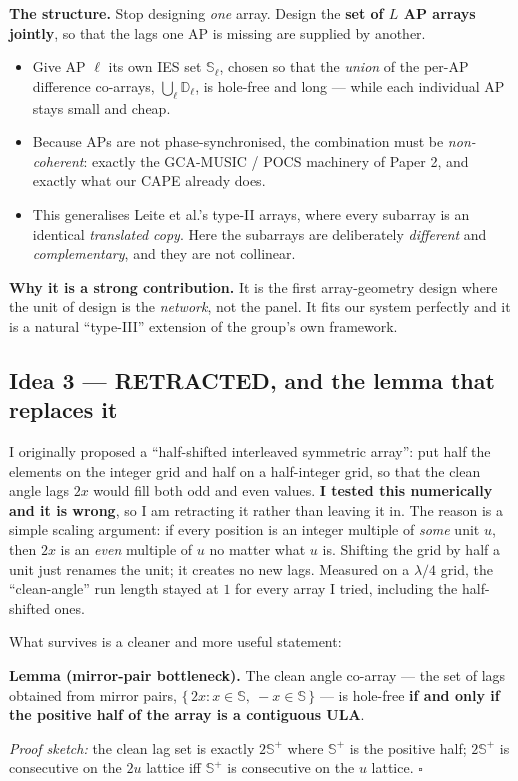 \documentclass[11pt]{article}
\begin{document}
\begin{ideabox}
\textbf{The structure.} Stop designing \emph{one} array. Design the \textbf{set of $L$ AP arrays
jointly}, so that the lags one AP is missing are supplied by another.
\begin{itemize}
\item Give AP $\ell$ its own IES set $\mathbb{S}_\ell$, chosen so that the \emph{union} of the
per-AP difference co-arrays, $\bigcup_\ell \mathbb{D}_\ell$, is hole-free and long --- while each
individual AP stays small and cheap.
\item Because APs are not phase-synchronised, the combination must be \emph{non-coherent}: exactly
the GCA-MUSIC / POCS machinery of Paper 2, and exactly what our CAPE already does.
\item This generalises Leite et al.'s type-II arrays, where every subarray is an identical
\emph{translated copy}. Here the subarrays are deliberately \emph{different} and
\emph{complementary}, and they are not collinear.
\end{itemize}
\textbf{Why it is a strong contribution.} It is the first array-geometry design where the unit of
design is the \emph{network}, not the panel. It fits our system perfectly and it is a natural
``type-III'' extension of the group's own framework.
\end{ideabox}

\subsection{Idea 3 --- RETRACTED, and the lemma that replaces it}

I originally proposed a ``half-shifted interleaved symmetric array'': put half the elements on the
integer grid and half on a half-integer grid, so that the clean angle lags $2x$ would fill both odd
and even values. \textbf{I tested this numerically and it is wrong}, so I am retracting it rather
than leaving it in. The reason is a simple scaling argument: if every position is an integer
multiple of \emph{some} unit $u$, then $2x$ is an \emph{even} multiple of $u$ no matter what $u$ is.
Shifting the grid by half a unit just renames the unit; it creates no new lags. Measured on a
$\lambda/4$ grid, the ``clean-angle'' run length stayed at $1$ for every array I tried, including
the half-shifted ones.

What survives is a cleaner and more useful statement:

\begin{keybox}
\textbf{Lemma (mirror-pair bottleneck).} The clean angle co-array --- the set of lags obtained from
mirror pairs, $\{\,2x : x\in\mathbb{S},\ -x\in\mathbb{S}\,\}$ --- is hole-free \textbf{if and only
if the positive half of the array is a contiguous ULA}.

\emph{Proof sketch:} the clean lag set is exactly $2\mathbb{S}^{+}$ where $\mathbb{S}^{+}$ is the
positive half; $2\mathbb{S}^{+}$ is consecutive on the $2u$ lattice iff $\mathbb{S}^{+}$ is
consecutive on the $u$ lattice. $\square$
\end{keybox}
\end{document}
